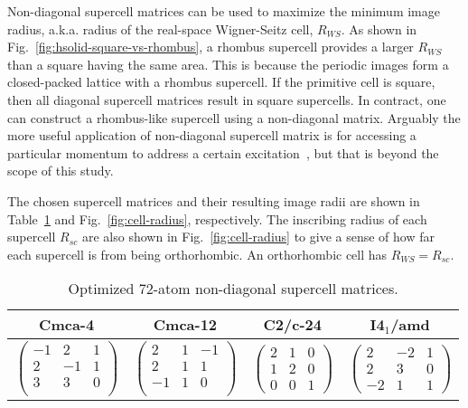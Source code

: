 Non-diagonal supercell matrices can be used to maximize the minimum image radius, a.k.a. radius of the real-space Wigner-Seitz cell, $R_{WS}$.
As shown in Fig.~\ref{fig:hsolid-square-vs-rhombus}, a rhombus supercell provides a larger $R_{WS}$ than a square having the same area.
This is because the periodic images form a closed-packed lattice with a rhombus supercell.
If the primitive cell is square, then all diagonal supercell matrices result in square supercells. In contract, one can construct a rhombus-like supercell using a non-diagonal matrix.
Arguably the more useful application of non-diagonal supercell matrix is for accessing a particular momentum to address a certain excitation~\cite{Lloyd-Williams2015}, but that is beyond the scope of this study.

The chosen supercell matrices and their resulting image radii are shown in Table~\ref{tab:hsolid-tmat72} and Fig.~\ref{fig:cell-radius}, respectively.
The inscribing radius of each supercell $R_{sc}$ are also shown in Fig.~\ref{fig:cell-radius} to give a sense of how far each supercell is from being orthorhombic. An orthorhombic cell has $R_{WS} = R_{sc}$.
\begin{table}[h]
\centering
\caption{Optimized 72-atom non-diagonal supercell matrices.}
\label{tab:hsolid-tmat72}
\begin{tabular}{cccc}
\hline\hline
Cmca-4 & Cmca-12 & C2/c-24 & I4$_1$/amd \\
\hline
$\left(\begin{array}{rrr}
-1 &  2 &  1 \\
 2 & -1 &  1 \\
 3 &  3 &  0 \\
\end{array}\right)$ & $\left(\begin{array}{rrr}
 2 &  1 &  -1 \\
 2 &  1 &   1 \\
 -1 &  1 &  0 \\
\end{array}\right)$ & $\left(\begin{array}{rrr}
 2 &  1 &  0 \\
 1 &  2 &  0 \\
 0 &  0 &  1
\end{array}\right)$ & $\left(\begin{array}{rrr}
 2 & -2 &  1 \\
 2 &  3 &  0 \\
-2 &  1 &  1
\end{array}\right)$ \\
\hline\hline
\end{tabular}
\end{table}

